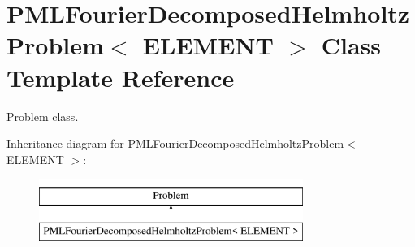 \hypertarget{classPMLFourierDecomposedHelmholtzProblem}{}\section{P\+M\+L\+Fourier\+Decomposed\+Helmholtz\+Problem$<$ E\+L\+E\+M\+E\+NT $>$ Class Template Reference}
\label{classPMLFourierDecomposedHelmholtzProblem}


Problem class.  


Inheritance diagram for P\+M\+L\+Fourier\+Decomposed\+Helmholtz\+Problem$<$ E\+L\+E\+M\+E\+NT $>$\+:\begin{figure}[H]
\begin{center}
\leavevmode
\includegraphics[height=2.000000cm]{classPMLFourierDecomposedHelmholtzProblem}
\end{center}
\end{figure}
